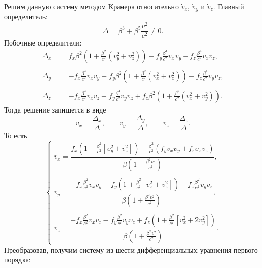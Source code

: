 Решим данную систему методом Крамера относительно $\dot{v}_x$, $\dot{v}_y$ и $\dot{v}_z$. 
Главный определитель:
\begin{equation*}
\Delta = \beta^3 + \beta^5 \frac{v^2}{c^2} \neq 0.
\end{equation*}
Побочные определители:
\begin{eqnarray*}
\Delta_x &=& f_x \beta^2 \left( 1+ \frac{\beta^2}{c^2} (v^2_y +  v_z^2) \right)  - f_y \frac{\beta^4}{c^2} v_x v_y - f_z \frac{\beta^4}{c^2} v_x v_z, \\ \\
\Delta_y &=& -f_x \frac{\beta^4}{c^2} v_x v_y + f_y \beta^2 \left( 1 + \frac{\beta^2}{c^2}(v_x^2 + v_z^2) \right)  - f_z \frac{\beta^4}{c^2} v_y v_z, \\ \\
\Delta_z &=& - f_x \frac{\beta^4}{c^2} v_x v_z - f_y \frac{\beta^4}{c^2} v_y v_z + f_z \beta^2 \left( 1 + \frac{\beta^2}{c^2} (v_x^2 +  v_y^2) \right).
\end{eqnarray*}
Тогда решение запишется в виде \cite{iliin_algebra}
\begin{equation*}
\dot{v}_x = \frac{\Delta_x}{\Delta}, \qquad \dot{v}_y = \frac{\Delta_y}{\Delta}, \qquad \dot{v}_z = \frac{\Delta_z}{\Delta}.
\end{equation*}
То есть
\begin{equation*}
\begin{cases}
\dot{v}_x = \dfrac{f_x (1+ \frac{\beta^2}{c^2}  [ v^2_y +  v_z^2 ]) - \frac{\beta^2}{c^2} ( f_y v_x v_y + f_z v_x v_z) }{\beta \left( 1 + \frac{\beta^2 v^2}{c^2}\right) }, \\ \\

\dot{v}_y = \dfrac{-f_x \frac{\beta^2}{c^2} v_x v_y + f_y (1 + \frac{\beta^2}{c^2} [v_x^2 + v_z^2]) - f_z \frac{\beta^2}{c^2} v_y v_z }{\beta \left( 1 + \frac{\beta^2 v^2}{c^2} \right) }, \\ \\

\dot{v}_z = \dfrac{- f_x \frac{\beta^2}{c^2} v_x v_z - f_y \frac{\beta^2}{c^2} v_y v_z + f_z (1 + \frac{\beta^2}{c^2} [v_x^2 + 2 v_y^2]) }{\beta \left( 1 + \frac{\beta^2 v^2}{c^2}\right) }. 
\end{cases}
\end{equation*}
Преобразовав, получим систему из шести дифференциальных уравнения первого порядка:

